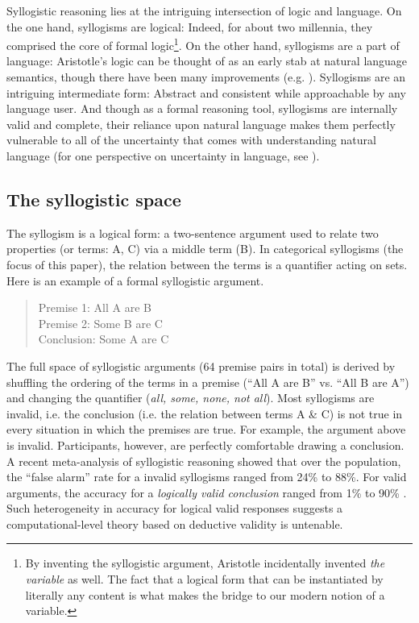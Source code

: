 \documentclass{article} %
\begin{document}
Syllogistic reasoning lies at the intriguing intersection of logic and language. On the one hand, syllogisms are logical: Indeed, for about two millennia, they comprised the core of formal logic\footnote{By inventing the syllogistic argument, Aristotle incidentally invented \emph{the variable} as well. The fact that a logical form that can be instantiated by literally any content is what makes the bridge to our modern notion of a variable.}. On the other hand, syllogisms are a part of language: Aristotle's logic can be thought of as an early stab at natural language semantics, though there have been many improvements (e.g. ). Syllogisms are an intriguing intermediate form: Abstract and consistent while approachable by any language user. And though as a formal reasoning tool, syllogisms are internally valid and complete, their reliance upon natural language makes them perfectly vulnerable to all of the uncertainty that comes with understanding natural language (for one perspective on uncertainty in language, see ).

\subsection{The syllogistic space}

The syllogism is a logical form: a two-sentence argument used to relate two properties (or terms: A, C) via a middle term (B). In categorical syllogisms (the focus of this paper), the relation between the terms is a quantifier acting on sets. Here is an example of a formal syllogistic argument.
\begin{quote}
Premise 1: All A are B\\
Premise 2: Some B are C\\
Conclusion: Some A are C
\end{quote}
The full space of syllogistic arguments (64 premise pairs in total) is derived by shuffling the ordering of the terms in a premise (``All A are B'' vs. ``All B are A'') and changing the quantifier (\emph{all, some, none, not all}). Most syllogisms are invalid, i.e. the conclusion (i.e. the relation between terms A \& C) is not true in every situation in which the premises are true. For example, the argument above is invalid. Participants, however, are perfectly comfortable drawing a conclusion. A recent meta-analysis of syllogistic reasoning showed that over the population, the ``false alarm'' rate for a invalid syllogisms ranged from 24\% to 88\%. For valid arguments, the accuracy for a \emph{logically valid conclusion} ranged from 1\% to 90\% \cite{Khemlani2012}. Such heterogeneity in accuracy for logical valid responses suggests a computational-level theory based on deductive validity is untenable. 
\end{document}
